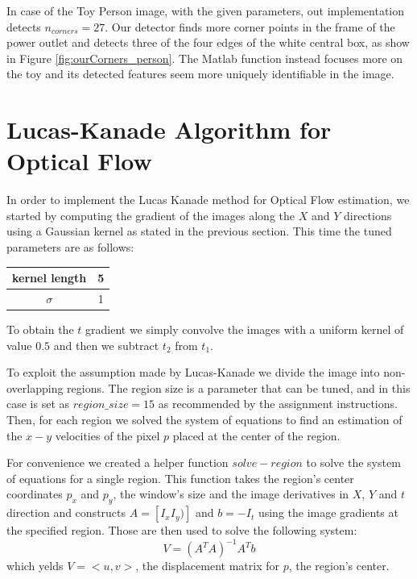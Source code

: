 \documentclass[11pt]{article}
\begin{document}
In case of the Toy Person image, with the given parameters, out implementation
detects $n_{corners} = 27$. Our detector finds more corner points in the frame
of the power outlet and detects three of the four edges of the white central
box, as show in Figure \ref{fig:ourCorners_person}. The Matlab function
instead focuses more on the toy and its detected features seem more uniquely
identifiable in the image.

\section{Lucas-Kanade Algorithm for Optical Flow}
In order to implement the Lucas Kanade method for Optical Flow estimation, we started by
computing the gradient of the images along the $X$ and $Y$ directions using a Gaussian
kernel as stated in the previous section. This time the tuned parameters are as follows: 

\begin{center}
	\begin{tabular}{| c | c |}
		\hline
		\textbf{kernel length} & 5   \\ \hline
		\textbf{$\sigma$}      & 1  \\ 
		\hline
	\end{tabular}
\end{center}

To obtain the $t$ gradient we simply convolve the images with a uniform kernel
of value $0.5$ and then we subtract $t_2$ from $t_1$.

To exploit the assumption made by Lucas-Kanade we divide the image into
non-overlapping regions. The region size is a parameter that can be tuned, and
in this case is set as $region\_size= 15$ as recommended by the assignment instructions. Then, for each region we solved the
system of equations to find an estimation of the $x-y$ velocities of the
pixel $p$ placed at the center of the region.

For convenience we created a helper function $solve-region$ to solve the system
of equations for a single region. This function takes the region's center
coordinates $p_x$ and $p_y$, the window's size and the image derivatives in $X$,
$Y$ and $t$ direction and constructs $A = [I_x I_y)]$ and $b = -I_t$ using the
image gradients at the specified region. Those are then used to solve the
following system:
$$V = (A^TA)^{-1}A^Tb$$
which yelds $V = <u, v>$, the displacement matrix for $p$, the region's center.
\end{document}
